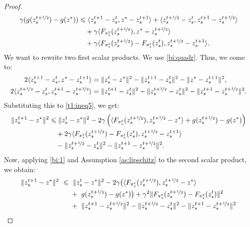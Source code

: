 \documentclass{article}
\begin{document}
\begin{proof}
\begin{align}
           \notag\gamma(g(z_s^{t+\nicefrac{1}{2}}) - g(z^*)) & \leqslant  \langle z_s^{t+1} - z_s^t, z^* - z_s^{t+1}\rangle + \langle z_s^{t+\nicefrac{1}{2}} - z_s^t, z_s^{t+1} - z_s^{t+\nicefrac{1}{2}}\rangle \\
           \notag& \quad+\gamma\langle F_{\pi_s^t}(z_s^{t+\nicefrac{1}{2}}), z^* - z_s^{t+\nicefrac{1}{2}}\rangle \\
           \label{t1:ineq5}& \quad+ \gamma\langle F_{\pi_s^t}(z_s^{t+\nicefrac{1}{2}}) - F_{\pi_s^t}(z_s^t), z_s^{t+\nicefrac{1}{2}} - z_s^{t+1}\rangle .
        \end{align}
        We want to rewrite two first scalar products.  We use \eqref{bi:quadr}. Thus, we come to:
        \begin{align*}
            2\langle z_s^{t+1} - z_s^t, z^* - z_s^{t+1}\rangle &= \|z_s^{t} - z^*\|^2 - \| z_s^{t+1} - z_s^t\|^2 - \|z^* - z_s^{t+1}\|^2,\\
            2\langle z_s^{t+\nicefrac{1}{2}} - z_s^t, z_s^{t+1} - z_s^{t+\nicefrac{1}{2}}\rangle &= \|z_s^{t+1} - z_s^t\|^2 - \|z_s^{t+\nicefrac{1}{2}} - z_s^t\|^2 - \|z_s^{t+1} - z_s^{t+\nicefrac{1}{2}}\|^2.
        \end{align*}
        Substituting this to \eqref{t1:ineq5}, we get:
        \begin{align*}
            \|z_s^{t+1} - z^*\|^2 &\leqslant \|z_s^t - z^*\|^2 - 2\gamma\left(\langle F_{\pi_s^t}(z_s^{t+\nicefrac{1}{2}}), z_s^{t+\nicefrac{1}{2}} - z^*\rangle + g(z_s^{t+\nicefrac{1}{2}}) - g(z^*) \right) \\
            & \quad + 2\gamma\langle F_{\pi_s^t}(z_s^{t+\nicefrac{1}{2}}) - F_{\pi_s^t}(z_s^t), z_s^{t+\nicefrac{1}{2}} - z_s^{t+1}\rangle \\
            & \quad - \|z_s^{t+\nicefrac{1}{2}} - z_s^t\|^2 - \|z_s^{t+1} - z_s^{t+\nicefrac{1}{2}}\|^2.
        \end{align*}
        Now, applying \eqref{bi:1} and Assumption \ref{as:lipschitz} to the second scalar product, we obtain:
        \begin{align}
            \notag\|z_s^{t+1} - z^*\|^2 &~\leqslant ~\|z_s^t - z^*\|^2 - 2\gamma\bigl(\langle F_{\pi_s^t}(z_s^{t+\nicefrac{1}{2}}), z_s^{t+\nicefrac{1}{2}} - z^*\rangle\\
            \notag
            & ~~\quad + ~ g(z_s^{t+\nicefrac{1}{2}}) - g(z^*) \bigr) + \gamma^2\|F_{\pi_s^t}(z_s^{t+\nicefrac{1}{2}}) - F_{\pi_s^t}(z_s^t)\|^2\\
            \notag
            & ~~\quad + ~ \|z_s^{t+1} - z_s^{t+\nicefrac{1}{2}}\|^2 - \|z_s^{t+\nicefrac{1}{2}} - z_s^t\|^2 - \|z_s^{t+1} - z_s^{t+\nicefrac{1}{2}}\|^2\\

\end{align}
\end{proof}
\end{document}
